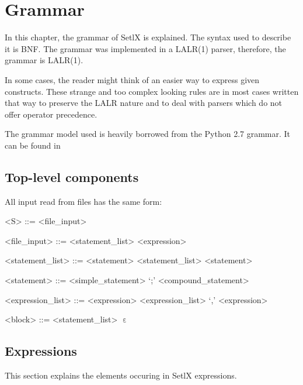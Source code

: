 \section{Grammar}

In this chapter, the grammar of SetlX is explained. The syntax used to describe it is BNF. The grammar was implemented in a LALR(1) parser, therefore, the grammar is LALR(1). 

In some cases, the reader might think of an easier way to express given constructs. These strange and too complex looking rules are in most cases written that way to preserve the LALR nature and to deal with parsers which do not offer operator precedence.

The grammar model used is heavily borrowed from the Python 2.7 grammar. It can be found in 

%
%
\clearpage
\subsection{Top-level components}

All input read from files has the same form:

\begin{grammar}
<S> ::= <file_input>

<file_input> ::= <statement_list>
\alt <expression>

<statement_list> ::= <statement>
\alt <statement_list> <statement>

<statement> ::= <simple_statement> `;'
\alt <compound_statement>

<expression_list> ::= <expression>
\alt <expression_list> `,' <expression>

<block> ::= <statement_list>
\alt $\upepsilon$
\end{grammar}

%
%
\clearpage
\subsection{Expressions}

This section explains the elements occuring in SetlX expressions.

